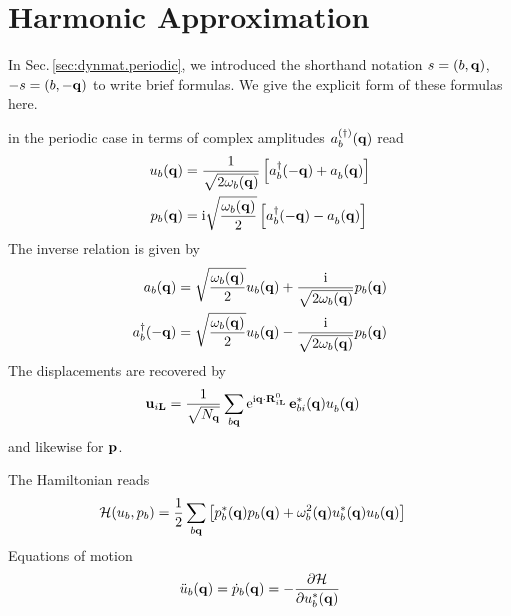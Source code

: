\section{Harmonic Approximation}
\label{app:formulas.ha}
In Sec.\,\ref{sec:dynmat.periodic}, we introduced the shorthand notation $s=(b, {\bf q})$, $-s=(b, -{\bf q})$ to write brief formulas. We give the explicit form of these formulas here.

 in the periodic case in terms of complex amplitudes $a^{(\dagger)}_b ({\bf q})$ read
\begin{subequations}
	\label{eq:u_b(q).amplitudes}
	\begin{align}
	u_b (\b q)
	&=   \frac{1}{\sqrt{2 \omega_b (\b q)}} \left[ \D a_b (- \b q) + \fD a_b (\b q)  \right] \\
	p_b (\b q)
	&= \im \sqrt{\frac{\omega_b (\b q)}{2}} \left[ \D a_b (- \b q) - \fD a_b (\b q)  \right]
	\end{align}
	\end{subequations}
	The inverse relation is given by
	\begin{subequations}
		\label{eq:a(q)}
		\begin{align}
		a_b ({\bf q})
		&= \sqrt{\frac{\omega_b ({\bf q})}{2}} u_b ({\bf q}) + \frac{{\rm i}}{\sqrt{2 \omega_b ({\bf q})}} p_b ({\bf q}) \\
		a^\dagger_b (-  {\bf q})
		&= \sqrt{\frac{\omega_b ({\bf q})}{2}} u_b ({\bf q}) - \frac{{\rm i}}{\sqrt{2 \omega_b ({\bf q})}} p_b ({\bf q})
		\end{align}
		\end{subequations}
		The displacements are recovered by
		\begin{align}
		\b u_{i \b L}
		&= \frac{1}{\sqrt{N_{\b q}}} \sum_{b \b q} {\rm e}^{\im  \b q \cdot \b R^0_{i \b L}} \, \b e^\ast_{b i} (\b q) \fD u_b (\b q)
		\label{eq:u_iL}
		\end{align}
		and likewise for ${\bf p}$.
		
		The Hamiltonian reads
		\begin{align}
		\mathcal H (u_b, p_b)
		&= \frac{1}{2} \sum_{b {\bf q}} \left[ p^\ast_b ({\bf q}) p_b ({\bf q}) + \omega^2_b ({\bf q}) u^\ast_b ({\bf q}) u_b ({\bf q}) \right] 
		\end{align}
		Equations of motion
		\begin{align}
		\ddot{u}_b ({\bf q})
		= \dot{p}_b ({\bf q})
		= - \frac{\partial \mathcal{H}}{\partial u_b^\ast ({\bf q})}
		\end{align}

